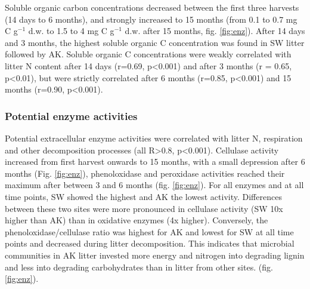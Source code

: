 Soluble organic carbon concentrations decreased between the first three harvests (14 days to 6 months), and strongly increased to 15 months (from 0.1 to 0.7 mg C g$^{-1}$  d.w. to 1.5 to 4 mg C g$^{-1}$ d.w. after 15 months, fig. \ref{fig:enz}). After 14 days and 3 months, the highest soluble organic C concentration was found in SW litter followed by AK. Soluble organic C concentrations were weakly correlated with litter N content after 14 days (r=0.69, p\textless 0.001) and after 3 months (r = 0.65, p\textless 0.01), but were strictly correlated after 6 months (r=0.85, p\textless 0.001) and 15 months (r=0.90, p\textless 0.001).


\subsubsection*{Potential enzyme activities}
Potential extracellular enzyme activities were correlated with litter N, respiration and other decomposition processes (all R\textgreater 0.8, p\textless 0.001). Cellulase activity increased from first harvest onwards to 15 months, with a small depression after 6 months (Fig. \ref{fig:enz}), phenoloxidase and peroxidase activities reached their maximum after between 3 and 6 months (fig. \ref{fig:enz}). For all enzymes and at all time points, SW showed the highest and AK the lowest activity. Differences between these two sites were more pronounced in cellulase activity (SW 10x higher than AK) than in oxidative enzymes (4x higher). Conversely, the phenoloxidase/cellulase ratio was highest for AK and lowest for SW at all time points and decreased during litter decomposition. This indicates that microbial communities in AK litter invested more energy and nitrogen into degrading lignin and less into degrading carbohydrates than in litter from other sites. (fig. \ref{fig:enz}).

